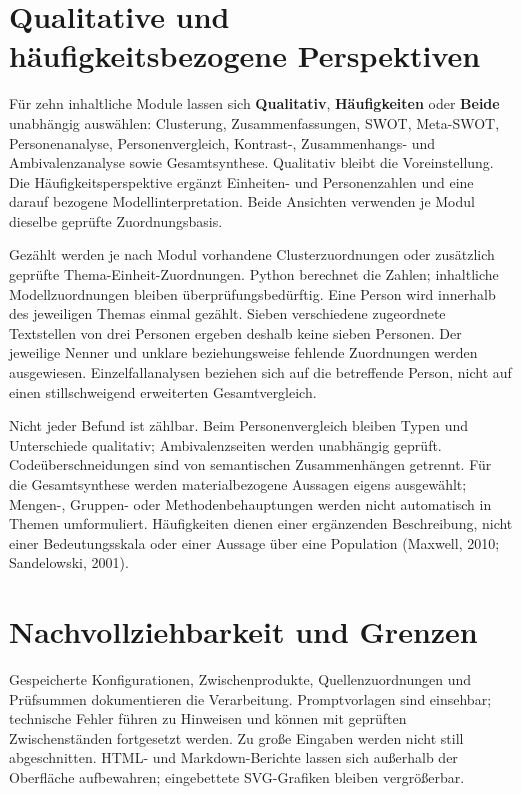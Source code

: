 \documentclass[11pt,a4paper]{article}
\begin{document}
\section*{Qualitative und häufigkeitsbezogene Perspektiven}

Für zehn inhaltliche Module lassen sich \textbf{Qualitativ}, \textbf{Häufigkeiten} oder \textbf{Beide} unabhängig auswählen: Clusterung, Zusammenfassungen, SWOT, Meta-SWOT, Personenanalyse, Personenvergleich, Kontrast-, Zusammenhangs- und Ambivalenzanalyse sowie Gesamtsynthese. Qualitativ bleibt die Voreinstellung. Die Häufigkeitsperspektive ergänzt Einheiten- und Personenzahlen und eine darauf bezogene Modellinterpretation. Beide Ansichten verwenden je Modul dieselbe geprüfte Zuordnungsbasis.

Gezählt werden je nach Modul vorhandene Clusterzuordnungen oder zusätzlich geprüfte Thema-Einheit-Zuordnungen. Python berechnet die Zahlen; inhaltliche Modellzuordnungen bleiben überprüfungsbedürftig. Eine Person wird innerhalb des jeweiligen Themas einmal gezählt. Sieben verschiedene zugeordnete Textstellen von drei Personen ergeben deshalb keine sieben Personen. Der jeweilige Nenner und unklare beziehungsweise fehlende Zuordnungen werden ausgewiesen. Einzelfallanalysen beziehen sich auf die betreffende Person, nicht auf einen stillschweigend erweiterten Gesamtvergleich.

Nicht jeder Befund ist zählbar. Beim Personenvergleich bleiben Typen und Unterschiede qualitativ; Ambivalenzseiten werden unabhängig geprüft. Codeüberschneidungen sind von semantischen Zusammenhängen getrennt. Für die Gesamtsynthese werden materialbezogene Aussagen eigens ausgewählt; Mengen-, Gruppen- oder Methodenbehauptungen werden nicht automatisch in Themen umformuliert. Häufigkeiten dienen einer ergänzenden Beschreibung, nicht einer Bedeutungsskala oder einer Aussage über eine Population (Maxwell, 2010; Sandelowski, 2001).

\newpage
\section*{Nachvollziehbarkeit und Grenzen}

Gespeicherte Konfigurationen, Zwischenprodukte, Quellenzuordnungen und Prüfsummen dokumentieren die Verarbeitung. Promptvorlagen sind einsehbar; technische Fehler führen zu Hinweisen und können mit geprüften Zwischenständen fortgesetzt werden. Zu große Eingaben werden nicht still abgeschnitten. HTML- und Markdown-Berichte lassen sich außerhalb der Oberfläche aufbewahren; eingebettete SVG-Grafiken bleiben vergrößerbar.
\end{document}
